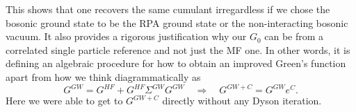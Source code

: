 This shows that one recovers the same cumulant irregardless if we chose the bosonic ground state to be the RPA ground state or the non-interacting bosonic vacuum. It also provides a rigorous justification why our $G_0$ can be from a correlated single particle reference and not just the MF one. In other words, it is defining an algebraic procedure for how to obtain an improved Green's function apart from how we think diagrammatically as
\begin{equation}
G^{GW} = G^{HF} + G^{HF} \Sigma^{GW} G^{GW} \quad\Rightarrow\quad G^{GW+C} = G^{GW} e^{C}.
\end{equation}
Here we were able to get to $G^{GW+C}$ directly without any Dyson iteration.

